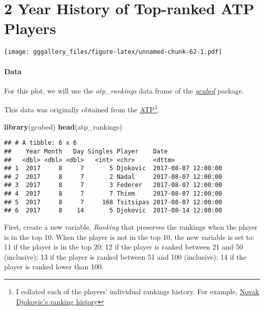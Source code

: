 \documentclass[]{book}
\newenvironment{Shaded}{\begin{snugshade}}{\end{snugshade}}
\newcommand{\KeywordTok}[1]{\textcolor[rgb]{0.13,0.29,0.53}{\textbf{#1}}}
\newcommand{\NormalTok}[1]{#1}
\let\rmarkdownfootnote\footnote%
\def\footnote{\protect\rmarkdownfootnote}
\begin{document}
\hypertarget{atp}{%
\chapter*{2 Year History of Top-ranked ATP Players}\label{atp}}

\texttt{[image: gggallery\_files/figure-latex/unnamed-chunk-62-1.pdf]}

\hypertarget{atpdata}{%
\subsubsection*{Data}\label{atpdata}}

For this plot, we will use the \emph{atp\_rankings} data frame of the \protect\hyperlink{gcubed}{\emph{gcubed}} package.

This data was originally obtained from the \href{https://www.atptour.com/}{ATP}\footnote{I collated each of the players' individual rankings history. For example, \href{https://www.atptour.com/en/players/novak-djokovic/d643/overview}{Novak Djokovic's ranking history}}.

\begin{Shaded}
\begin{Highlighting}[]
\KeywordTok{library}\NormalTok{(gcubed)}
\KeywordTok{head}\NormalTok{(atp_rankings)}
\end{Highlighting}
\end{Shaded}

\begin{verbatim}
## # A tibble: 6 x 6
##    Year Month   Day Singles Player    Date               
##   <dbl> <dbl> <dbl>   <int> <chr>     <dttm>             
## 1  2017     8     7       5 Djokovic  2017-08-07 12:00:00
## 2  2017     8     7       2 Nadal     2017-08-07 12:00:00
## 3  2017     8     7       3 Federer   2017-08-07 12:00:00
## 4  2017     8     7       7 Thiem     2017-08-07 12:00:00
## 5  2017     8     7     168 Tsitsipas 2017-08-07 12:00:00
## 6  2017     8    14       5 Djokovic  2017-08-14 12:00:00
\end{verbatim}

First, create a new variable, \emph{Ranking} that preserves the rankings when the player is in the top 10. When the player is not in the top 10, the new variable is set to: 11 if the player is in the top 20; 12 if the player is ranked between 21 and 50 (inclusive); 13 if the player is ranked between 51 and 100 (inclusive); 14 if the player is ranked lower than 100.
\end{document}
